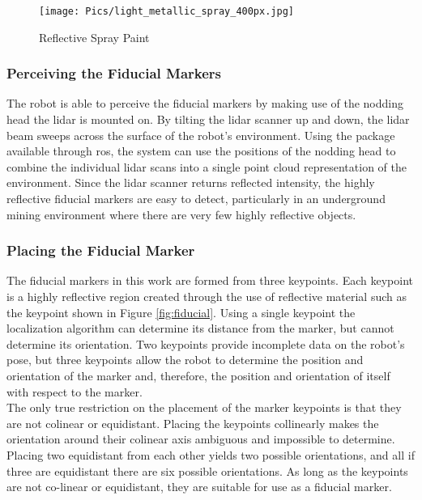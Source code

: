 \begin{figure}[h]
    \centering
    \texttt{[image: Pics/light\_metallic\_spray\_400px.jpg]}
    \caption{Reflective Spray Paint \cite{spraypaint}}
    \label{fig:irspray}
\end{figure}

\subsubsection{Perceiving the Fiducial Markers}

The robot is able to perceive the fiducial markers by making use of the nodding head the \acrshort{lidar} is mounted on. By tilting the \acrshort{lidar} scanner up and down, the \acrshort{lidar} beam sweeps across the surface of the robot's environment. Using the  package available through \acrshort{ros}, the system can use the positions of the nodding head to combine the individual \acrshort{lidar} scans into a single point cloud representation of the environment. Since the \acrshort{lidar} scanner returns reflected intensity, the highly reflective fiducial markers are easy to detect, particularly in an underground mining environment where there are very few highly reflective objects.\\

\subsubsection{Placing the Fiducial Marker}
\label{sec:placing}
The fiducial markers in this work are formed from three keypoints. Each keypoint is a highly reflective region created through the use of reflective material such as the keypoint shown in Figure \ref{fig:fiducial}. Using a single keypoint the localization algorithm can determine its distance from the marker, but cannot determine its orientation. Two keypoints provide incomplete data on the robot's pose, but three keypoints allow the robot to determine the position and orientation of the marker and, therefore, the position and orientation of itself with respect to the marker.\\

The only true restriction on the placement of the marker keypoints is that they are not colinear or equidistant. Placing the keypoints collinearly makes the orientation around their colinear axis ambiguous and impossible to determine. Placing two equidistant from each other yields two possible orientations, and all if three are equidistant there are six possible orientations. As long as the keypoints are not co-linear or equidistant, they are suitable for use as a fiducial marker.\\

